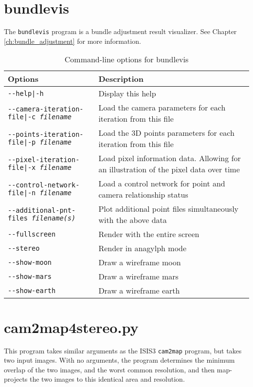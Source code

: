 \clearpage

\section{bundlevis}
\label{bundlevis}

The \texttt{bundlevis} program is a bundle adjustment result
visualizer.  See Chapter \ref{ch:bundle_adjustment} for more
information.

\begin{longtable}{|l|p{10cm}|}
\caption{Command-line options for bundlevis}
\label{tbl:bundlevis}
\endfirsthead
\endhead
\endfoot
\endlastfoot
\hline
Options & Description \\ \hline \hline
\texttt{-\/-help|-h} & Display this help \\ \hline
\texttt{-\/-camera-iteration-file|-c \textit{filename}} & Load the camera parameters for each iteration from this file \\ \hline
\texttt{-\/-points-iteration-file|-p \textit{filename}} & Load the 3D points parameters for each iteration from this file \\ \hline
\texttt{-\/-pixel-iteration-file|-x \textit{filename}} & Load pixel information data. Allowing for an illustration of the pixel data over time \\ \hline
\texttt{-\/-control-network-file|-n \textit{filename}} & Load a control network for point and camera relationship status \\ \hline
\texttt{-\/-additional-pnt-files \textit{filename(s)}} & Plot additional point files simultaneously with the above data \\ \hline
\texttt{-\/-fullscreen} & Render with the entire screen \\ \hline
\texttt{-\/-stereo} & Render in anagylph mode \\ \hline
\texttt{-\/-show-moon} & Draw a wireframe moon \\ \hline
\texttt{-\/-show-mars} & Draw a wireframe mars \\ \hline
\texttt{-\/-show-earth} & Draw a wireframe earth \\ \hline
\end{longtable}

\clearpage

\section{cam2map4stereo.py}
\label{cam2map4stereo}

This program takes similar arguments as the ISIS3 \texttt{cam2map} program,
but takes two input images.  With no arguments, the program determines
the minimum overlap of the two images, and the worst common resolution,
and then map-projects the two images to this identical area and resolution.


